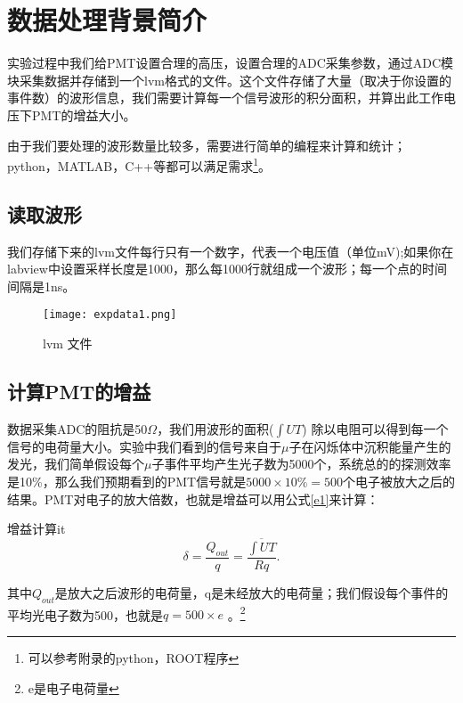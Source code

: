 \documentclass{elegantbook}
\author{ 物理楼\&220 }
\date{\today}
\begin{document}
\maketitle
\chapter{数据处理背景简介 }
实验过程中我们给PMT设置合理的高压，设置合理的ADC采集参数，通过ADC模块采集数据并存储到一个lvm格式的文件。这个文件存储了大量（取决于你设置的事件数）的波形信息，我们需要计算每一个信号波形的积分面积，并算出此工作电压下PMT的增益大小。

由于我们要处理的波形数量比较多，需要进行简单的编程来计算和统计；python，MATLAB，C++等都可以满足需求\footnote{可以参考附录的python，ROOT程序}。
\section{读取波形}
我们存储下来的lvm文件每行只有一个数字，代表一个电压值（单位mV);如果你在labview中设置采样长度是1000，那么每1000行就组成一个波形；每一个点的时间间隔是1ns。
\begin{figure}[!htbp]
	\centering
	\texttt{[image: expdata1.png]}
	\caption{lvm 文件\label{fig:g}}
\end{figure}


\section{计算PMT的增益}
数据采集ADC的阻抗是50$\Omega$，我们用波形的面积($\int UT$) 除以电阻可以得到每一个信号的电荷量大小。实验中我们看到的信号来自于$\mu$子在闪烁体中沉积能量产生的发光，我们简单假设每个$\mu$子事件平均产生光子数为5000个，系统总的的探测效率是10\%，那么我们预期看到的PMT信号就是$5000\times 10\%=500$个电子被放大之后的结果。PMT对电子的放大倍数，也就是增益可以用公式\ref{e1}来计算：
\begin{definition}{增益计算}{it}
\begin{equation}
   \label{e1}
	\delta=\frac{Q_{out}}{q}=\frac{\overline{\int UT}}{Rq}.
\end{equation}
\end{definition}
其中$Q_{out}$是放大之后波形的电荷量，q是未经放大的电荷量；我们假设每个事件的平均光电子数为500，也就是$q=500\times e$ 。\footnote{e是电子电荷量}
\end{document}

